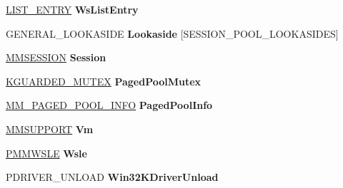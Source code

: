 \begin{DoxyCompactItemize}
\item 
\mbox{\label{struct___m_m___s_e_s_s_i_o_n___s_p_a_c_e_aa76d283fac6a6cfe6a98fb86c3a4f454}} 
\hyperlink{struct___l_i_s_t___e_n_t_r_y}{L\+I\+S\+T\+\_\+\+E\+N\+T\+RY} {\bfseries Ws\+List\+Entry}
\item 
\mbox{\label{struct___m_m___s_e_s_s_i_o_n___s_p_a_c_e_ab97ef42289a24ebc23e229058b9ef241}} 
G\+E\+N\+E\+R\+A\+L\+\_\+\+L\+O\+O\+K\+A\+S\+I\+DE {\bfseries Lookaside} \mbox{[}S\+E\+S\+S\+I\+O\+N\+\_\+\+P\+O\+O\+L\+\_\+\+L\+O\+O\+K\+A\+S\+I\+D\+ES\mbox{]}
\item 
\mbox{\label{struct___m_m___s_e_s_s_i_o_n___s_p_a_c_e_a6797096a3c7c60167efad0137ba53715}} 
\hyperlink{struct___m_m_s_e_s_s_i_o_n}{M\+M\+S\+E\+S\+S\+I\+ON} {\bfseries Session}
\item 
\mbox{\label{struct___m_m___s_e_s_s_i_o_n___s_p_a_c_e_a322442ee0e252b58d2bc72095ebf37b6}} 
\hyperlink{struct___k_g_u_a_r_d_e_d___m_u_t_e_x}{K\+G\+U\+A\+R\+D\+E\+D\+\_\+\+M\+U\+T\+EX} {\bfseries Paged\+Pool\+Mutex}
\item 
\mbox{\label{struct___m_m___s_e_s_s_i_o_n___s_p_a_c_e_a3c1dc0b9d4308f5486921f7290463553}} 
\hyperlink{struct___m_m___p_a_g_e_d___p_o_o_l___i_n_f_o}{M\+M\+\_\+\+P\+A\+G\+E\+D\+\_\+\+P\+O\+O\+L\+\_\+\+I\+N\+FO} {\bfseries Paged\+Pool\+Info}
\item 
\mbox{\label{struct___m_m___s_e_s_s_i_o_n___s_p_a_c_e_a9ff88fdd54b0e05d204b4b235a0a971a}} 
\hyperlink{struct___m_m_s_u_p_p_o_r_t}{M\+M\+S\+U\+P\+P\+O\+RT} {\bfseries Vm}
\item 
\mbox{\label{struct___m_m___s_e_s_s_i_o_n___s_p_a_c_e_aed646e84e2776721576e454622fe6466}} 
\hyperlink{struct___m_m_w_s_l_e}{P\+M\+M\+W\+S\+LE} {\bfseries Wsle}
\item 
\mbox{\label{struct___m_m___s_e_s_s_i_o_n___s_p_a_c_e_af5ef27f1fc281649fd3942822396ff39}} 
P\+D\+R\+I\+V\+E\+R\+\_\+\+U\+N\+L\+O\+AD {\bfseries Win32\+K\+Driver\+Unload}

\end{DoxyCompactItemize}

